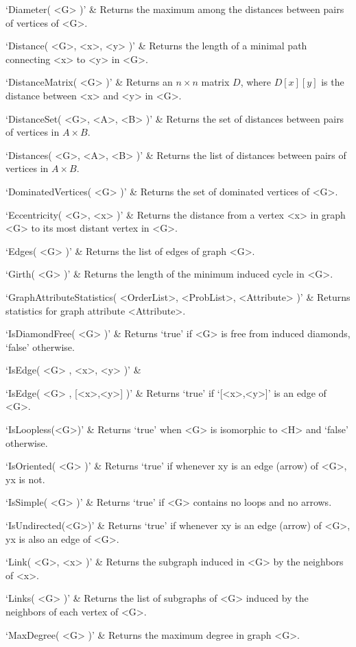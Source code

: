`Diameter( <G> )' & 
Returns the maximum among the distances between pairs of vertices of <G>.

`Distance( <G>, <x>, <y> )' & 
Returns the length of a minimal path connecting <x> to <y> in <G>.

`DistanceMatrix( <G> )' & 
Returns an $n\times n$ matrix $D$, where $D[x][y]$ is the distance between <x> and <y> in <G>.

`DistanceSet( <G>, <A>, <B> )' & 
Returns the set of distances between pairs of vertices in $A\times B$.

`Distances( <G>, <A>, <B> )' & 
Returns the list of distances between pairs of vertices in $A\times B$.

`DominatedVertices( <G> )' & 
Returns the set of dominated vertices of <G>.

`Eccentricity( <G>, <x> )' & 
Returns  the  distance  from a vertex <x> in graph <G> to its most distant vertex in <G>.

`Edges( <G> )' & 
Returns the list of edges of graph <G>.

`Girth( <G> )' &
Returns the length of the minimum induced cycle in <G>.

`GraphAttributeStatistics( <OrderList>, <ProbList>, <Attribute> )' &
Returns statistics for graph attribute <Attribute>. 

`IsDiamondFree( <G> )' & 
Returns `true' if <G> is free from induced diamonds, `false' otherwise.

`IsEdge( <G> , <x>, <y> )' & 

`IsEdge( <G> , [<x>,<y>] )' & 
Returns `true' if `[<x>,<y>]' is an edge of <G>.

`IsLoopless(<G>)' & 
Returns `true' when <G> is isomorphic to <H> and `false' otherwise.

`IsOriented( <G> )' & 
Returns `true' if whenever xy is an edge (arrow)  of <G>, yx is not.

`IsSimple( <G> )' & 
Returns `true' if <G> contains no loops and no arrows.

`IsUndirected(<G>)' & 
Returns `true' if whenever xy is an edge (arrow) of <G>, yx is also an edge of <G>.

`Link( <G>, <x> )' & 
Returns the subgraph induced in <G> by the neighbors of <x>.

`Links( <G> )' & 
Returns  the  list  of  subgraphs  of <G> induced by the neighbors of each vertex of <G>.

`MaxDegree( <G> )' & 
Returns the maximum degree in graph <G>.

